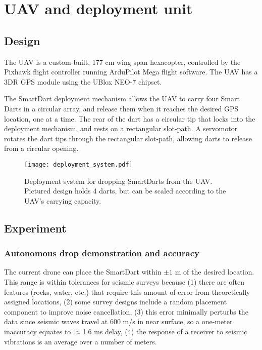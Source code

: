 \section{UAV and deployment unit}\label{sec:DeploymentUnit(UAV)}

\subsection{Design}
The UAV is a custom-built, 177 cm wing span hexacopter, controlled by the Pixhawk flight controller running ArduPilot Mega flight software. The UAV has a 3DR GPS module using the UBlox NEO-7 chipset.


 The SmartDart deployment mechanism allows the UAV to carry four Smart Darts in a circular array, and release them when it reaches the desired GPS location, one at a time. 
 The rear of the dart has a circular tip that locks into the deployment mechanism, and rests on a rectangular slot-path. 
 A servomotor rotates the dart tips through the rectangular slot-path, allowing darts to release from a circular opening.



\begin{figure} \centering
  {\texttt{[image: deployment\_system.pdf]}}
 \caption{Deployment system for dropping SmartDarts from the UAV. Pictured design holds 4 darts, but can be scaled according to the UAV's carrying capacity.} 
 \label{fig:TradvsAutoDrop}
\end{figure}



\subsection{Experiment}


\subsubsection{Autonomous drop demonstration and accuracy}

The current drone can place the SmartDart within $\pm1$ m of the desired location.  
This range is within tolerances for seismic surveys because
(1) there are often features (rocks, water, etc.) that require this amount of error from theoretically assigned locations,
(2) some survey designs include a random placement component to improve noise cancellation,
(3) this error minimally perturbs  the data since seismic waves travel at 600 m/s in near surface, so a one-meter inaccuracy equates to $\approx$1.6 ms delay,
(4) the response of a receiver to seismic vibrations is an average over a number of meters.


